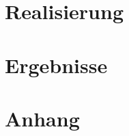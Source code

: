 \part{Realisierung} %




\cleardoublepage %

\part{Ergebnisse} %


\cleardoublepage %


\appendix

\part{Anhang} %



\cleardoublepage %

\cleardoublepage %

\cleardoublepage %




